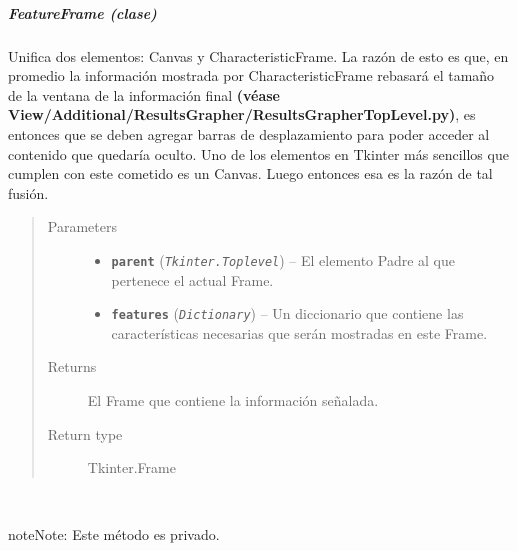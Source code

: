 \documentclass[class=report, crop=false]{standalone}
\begin{document}
\subparagraph{FeatureFrame (clase)}
\label{sec:a_3_3_2_3_2}
\begin{fulllineitems}

\begin{DUlineblock}{0em}
\item[] Unifica dos elementos: Canvas y CharacteristicFrame.\break
La razón de esto es que, en promedio la información mostrada 
por CharacteristicFrame rebasará el tamaño de la ventana de la 
información final \textbf{(véase View/}\break\textbf{Additional/ResultsGrapher/ResultsGrapherTopLevel.py)}, es 
entonces que se deben agregar barras de desplazamiento para poder 
acceder al contenido que quedaría oculto.\break
Uno de los elementos en Tkinter más sencillos que cumplen con 
este cometido es un Canvas. Luego entonces esa es la razón de 
tal fusión.
\end{DUlineblock}

\begin{quote}\begin{description}
\item[{Parameters}] \leavevmode\begin{itemize}
\item \textbf{\texttt{parent}} (\emph{\texttt{Tkinter.Toplevel}}) -- El elemento Padre al que pertenece el actual Frame.
\item \textbf{\texttt{features}} (\emph{\texttt{Dictionary}}) -- Un diccionario que contiene las características necesarias que serán mostradas en este Frame.
\end{itemize}

\item[{Returns}] \leavevmode
El Frame que contiene la información señalada.
\item[{Return type}] \leavevmode
Tkinter.Frame
\end{description}\end{quote}


\begin{fulllineitems}

~

\begin{notice}{note}{Note:}
Este método es privado.
\end{notice}


\end{fulllineitems}
\end{fulllineitems}
\end{document}

